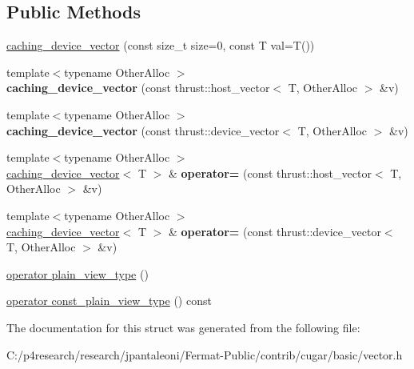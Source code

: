 \subsection*{Public Methods}
\begin{DoxyCompactItemize}
\item 
\hyperlink{group___basic_ga2146480a7d6cae513ac29c3ec28a73a3}{caching\+\_\+device\+\_\+vector} (const size\+\_\+t size=0, const T val=T())
\item 
{\footnotesize template$<$typename Other\+Alloc $>$ }\\{\bfseries caching\+\_\+device\+\_\+vector} (const thrust\+::host\+\_\+vector$<$ T, Other\+Alloc $>$ \&v)
\item 
{\footnotesize template$<$typename Other\+Alloc $>$ }\\{\bfseries caching\+\_\+device\+\_\+vector} (const thrust\+::device\+\_\+vector$<$ T, Other\+Alloc $>$ \&v)
\item 
{\footnotesize template$<$typename Other\+Alloc $>$ }\\\hyperlink{structcugar_1_1caching__device__vector}{caching\+\_\+device\+\_\+vector}$<$ T $>$ \& {\bfseries operator=} (const thrust\+::host\+\_\+vector$<$ T, Other\+Alloc $>$ \&v)
\item 
{\footnotesize template$<$typename Other\+Alloc $>$ }\\\hyperlink{structcugar_1_1caching__device__vector}{caching\+\_\+device\+\_\+vector}$<$ T $>$ \& {\bfseries operator=} (const thrust\+::device\+\_\+vector$<$ T, Other\+Alloc $>$ \&v)
\item 
\hyperlink{group___basic_ga88dd1949f9871da3aa4d4aefd0167c8b}{operator plain\+\_\+view\+\_\+type} ()
\item 
\hyperlink{group___basic_gacf7a82dbc75f3ff33d4cb3bc1cae2e2f}{operator const\+\_\+plain\+\_\+view\+\_\+type} () const
\end{DoxyCompactItemize}


The documentation for this struct was generated from the following file\+:\begin{DoxyCompactItemize}
\item 
C\+:/p4research/research/jpantaleoni/\+Fermat-\/\+Public/contrib/cugar/basic/vector.\+h\end{DoxyCompactItemize}
